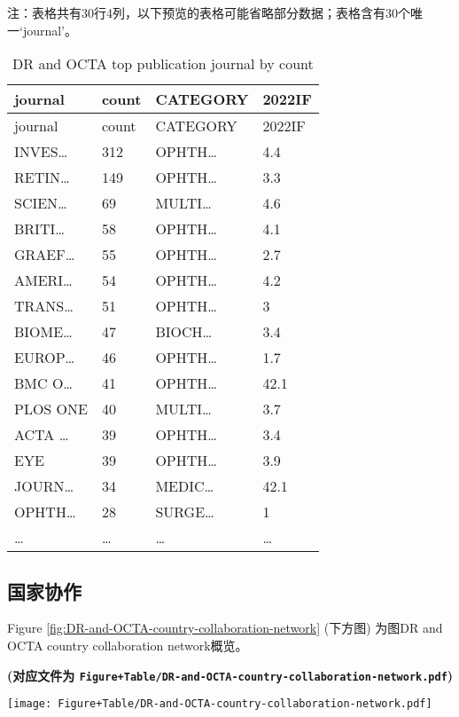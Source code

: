 \documentclass[
]{article}
\begin{document}
\begin{center}\begin{tcolorbox}[colback=gray!10, colframe=gray!50, width=0.9\linewidth, arc=1mm, boxrule=0.5pt]注：表格共有30行4列，以下预览的表格可能省略部分数据；表格含有30个唯一`journal'。
\end{tcolorbox}
\end{center}

\begin{longtable}[]{@{}llll@{}}
\caption{\label{tab:DR-and-OCTA-top-publication-journal-by-count}DR and OCTA top publication journal by count}\tabularnewline
\toprule
journal & count & CATEGORY & 2022IF\tabularnewline
\midrule
\endfirsthead
\toprule
journal & count & CATEGORY & 2022IF\tabularnewline
\midrule
\endhead
INVES\ldots{} & 312 & OPHTH\ldots{} & 4.4\tabularnewline
RETIN\ldots{} & 149 & OPHTH\ldots{} & 3.3\tabularnewline
SCIEN\ldots{} & 69 & MULTI\ldots{} & 4.6\tabularnewline
BRITI\ldots{} & 58 & OPHTH\ldots{} & 4.1\tabularnewline
GRAEF\ldots{} & 55 & OPHTH\ldots{} & 2.7\tabularnewline
AMERI\ldots{} & 54 & OPHTH\ldots{} & 4.2\tabularnewline
TRANS\ldots{} & 51 & OPHTH\ldots{} & 3\tabularnewline
BIOME\ldots{} & 47 & BIOCH\ldots{} & 3.4\tabularnewline
EUROP\ldots{} & 46 & OPHTH\ldots{} & 1.7\tabularnewline
BMC O\ldots{} & 41 & OPHTH\ldots{} & 42.1\tabularnewline
PLOS ONE & 40 & MULTI\ldots{} & 3.7\tabularnewline
ACTA \ldots{} & 39 & OPHTH\ldots{} & 3.4\tabularnewline
EYE & 39 & OPHTH\ldots{} & 3.9\tabularnewline
JOURN\ldots{} & 34 & MEDIC\ldots{} & 42.1\tabularnewline
OPHTH\ldots{} & 28 & SURGE\ldots{} & 1\tabularnewline
\ldots{} & \ldots{} & \ldots{} & \ldots{}\tabularnewline
\bottomrule
\end{longtable}

\hypertarget{ux56fdux5bb6ux534fux4f5c}{%
\subsection{国家协作}\label{ux56fdux5bb6ux534fux4f5c}}

Figure \ref{fig:DR-and-OCTA-country-collaboration-network} (下方图) 为图DR and OCTA country collaboration network概览。

\textbf{(对应文件为 \texttt{Figure+Table/DR-and-OCTA-country-collaboration-network.pdf})}

\def\@captype{figure}
\begin{center}
\texttt{[image: Figure+Table/DR-and-OCTA-country-collaboration-network.pdf]}
\caption{DR and OCTA country collaboration network}\label{fig:DR-and-OCTA-country-collaboration-network}
\end{center}
\end{document}
